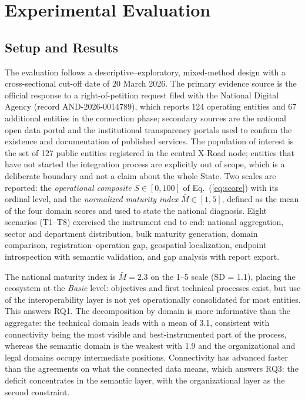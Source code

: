 \documentclass[runningheads]{llncs}
\begin{document}
\section{Experimental Evaluation}
\label{sec:eval}

\subsection{Setup and Results}
\label{sec:eval:setup}

The evaluation follows a descriptive--exploratory, mixed-method design with a
cross-sectional cut-off date of 20 March 2026. The primary evidence source is
the official response to a right-of-petition request filed with the National
Digital Agency (record AND-2026-0014789), which reports 124 operating
entities and 67 additional entities in the connection phase; secondary
sources are the national open data portal and the institutional transparency
portals used to confirm the existence and documentation of published
services. The population of interest is the set of 127 public entities
registered in the central X-Road node; entities that have not started the
integration process are explicitly out of scope, which is a deliberate
boundary and not a claim about the whole State. Two scales are reported: the
\emph{operational composite} $S \in [0,100]$ of Eq.~(\ref{eq:score}) with its
ordinal level, and the \emph{normalized maturity index} $\bar{M} \in [1,5]$,
defined as the mean of the four domain scores and used to state the national
diagnosis. Eight scenarios (T1--T8) exercised the instrument end to end:
national aggregation, sector and department distribution, bulk maturity
generation, domain comparison, registration--operation gap, geospatial
localization, endpoint introspection with semantic validation, and gap
analysis with report export.

The national maturity index is $\bar{M} = 2.3$ on the 1--5 scale (SD = 1.1),
placing the ecosystem at the \emph{Basic} level: objectives and first
technical processes exist, but use of the interoperability layer is not yet
operationally consolidated for most entities. This answers RQ1. The
decomposition by domain is more informative than the aggregate: the technical
domain leads with a mean of 3.1, consistent with connectivity being the most
visible and best-instrumented part of the process, whereas the semantic
domain is the weakest with 1.9 and the organizational and legal domains
occupy intermediate positions. Connectivity has advanced faster than the
agreements on what the connected data means, which answers RQ3: the deficit
concentrates in the semantic layer, with the organizational layer as the
second constraint.
\end{document}
